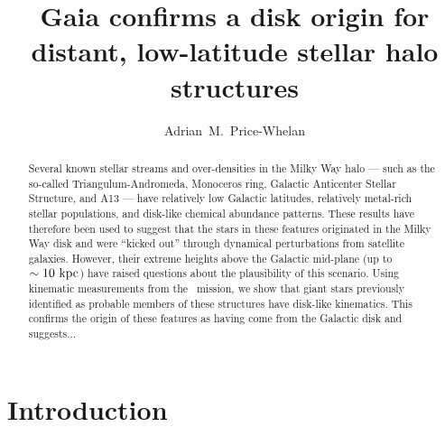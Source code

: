 \documentclass[twocolumn]{aastex62}
\newcommand{\gaia}{\project{Gaia}}
\begin{document}
\sloppy\sloppypar\raggedbottom\frenchspacing %

\title{Gaia confirms a disk origin for distant, low-latitude stellar halo structures}

\author[0000-0003-0872-7098]{Adrian~M.~Price-Whelan}



\begin{abstract}

Several known stellar streams and over-densities in the Milky Way halo --- such
as the so-called Triangulum-Andromeda, Monoceros ring, Galactic Anticenter
Stellar Structure, and A13 --- have relatively low Galactic latitudes,
relatively metal-rich stellar populations, and disk-like chemical abundance
patterns.
These results have therefore been used to suggest that the stars in these
features originated in the Milky Way disk and were ``kicked out'' through
dynamical perturbations from satellite galaxies.
However, their extreme heights above the Galactic mid-plane (up to $\sim
10~\mathrm{kpc}$) have raised questions about the plausibility of this scenario.
Using kinematic measurements from the \gaia\ mission, we show that giant stars
previously identified as probable members of these structures have disk-like
kinematics.
This confirms the origin of these features as having come from the Galactic
disk and suggests...

\end{abstract}


\section{Introduction}
\label{sec:introduction}
\end{document}

